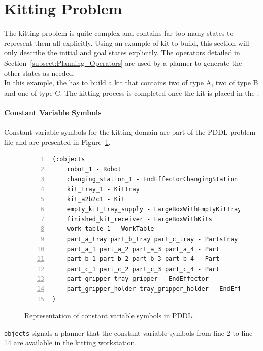 \section{Kitting Problem}
\label{S:kitting-problem}
The kitting problem is quite complex and contains far too many states to represent them all explicitly. Using an example of kit to build, this section will only describe the initial and goal states explicitly. The operators detailed in Section~\ref{subsect:Planning_Operators} are used by a planner to generate the other states as needed.\\
In this example, the  has to build a kit that contains two  of type A, two  of type B and one  of type C. The kitting process is completed once the kit is placed in the .

\paragraph{Constant Variable Symbols}
Constant variable symbols for the kitting domain are part of the PDDL problem file and are presented in Figure~\ref{fig:objects}.
\begin{figure}[t!h!]
\centering
\begin{minipage}{.5\paperwidth}
\begin{mylisting}
\begin{Verbatim}[commandchars=\\\{\},fontsize=\scriptsize, numbers=left, numbersep=2pt]
(:objects
    robot_1 - Robot
    changing_station_1 - EndEffectorChangingStation
    kit_tray_1 - KitTray
    kit_a2b2c1 - Kit
    empty_kit_tray_supply - LargeBoxWithEmptyKitTrays
    finished_kit_receiver - LargeBoxWithKits
    work_table_1 - WorkTable
    part_a_tray part_b_tray part_c_tray - PartsTray
    part_a_1 part_a_2 part_a_3 part_a_4 - Part
    part_b_1 part_b_2 part_b_3 part_b_4 - Part
    part_c_1 part_c_2 part_c_3 part_c_4 - Part
    part_gripper tray_gripper - EndEffector
    part_gripper_holder tray_gripper_holder - EndEffectorHolder
)
\end{Verbatim}
\end{mylisting}
\end{minipage}
\caption{Representation of constant variable symbols in PDDL.}
\label{fig:objects}
\end{figure}

\texttt{objects} signals a planner that the constant variable symbols from line 2 to line 14 are available in the kitting workstation.





